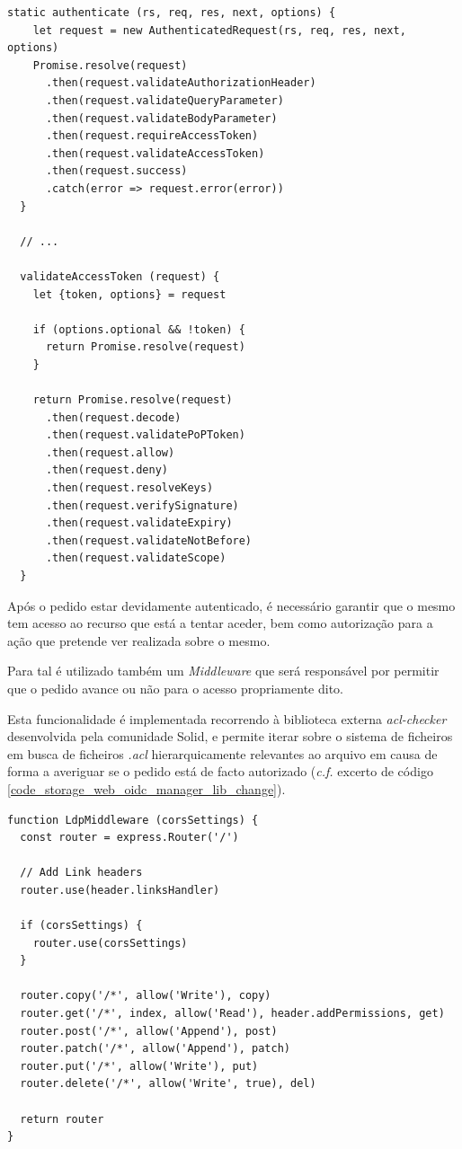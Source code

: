 \begin{lstlisting}[caption={Camada de validação do pedido e do token de acesso na biblioteca \emph{oidc-rs}}, label={code_storage_web_validacao_pedido_e_token}]
  static authenticate (rs, req, res, next, options) {
    let request = new AuthenticatedRequest(rs, req, res, next, options)
    Promise.resolve(request)
      .then(request.validateAuthorizationHeader)
      .then(request.validateQueryParameter)
      .then(request.validateBodyParameter)
      .then(request.requireAccessToken)
      .then(request.validateAccessToken)
      .then(request.success)
      .catch(error => request.error(error))
  }
  
  // ...

  validateAccessToken (request) {
    let {token, options} = request

    if (options.optional && !token) {
      return Promise.resolve(request)
    }

    return Promise.resolve(request)
      .then(request.decode)
      .then(request.validatePoPToken)
      .then(request.allow)
      .then(request.deny)
      .then(request.resolveKeys)
      .then(request.verifySignature)
      .then(request.validateExpiry)
      .then(request.validateNotBefore)
      .then(request.validateScope)
  }

\end{lstlisting}

Após o pedido estar devidamente autenticado, é necessário garantir que o mesmo tem acesso ao recurso que está a tentar aceder, bem como autorização para a ação que pretende ver realizada sobre o mesmo. 

Para tal é utilizado também um \emph{Middleware} que será responsável por permitir que o pedido avance ou não para o acesso propriamente dito.

Esta funcionalidade é implementada recorrendo à biblioteca externa \emph{acl-checker} desenvolvida pela comunidade Solid, e permite iterar sobre o sistema de ficheiros em busca de ficheiros \emph{.acl} hierarquicamente relevantes ao arquivo em causa de forma a averiguar se o pedido está de facto autorizado (\emph{c.f.} excerto de código \ref{code_storage_web_oidc_manager_lib_change}).

\begin{lstlisting}[caption={Alteração ao \emph{OIDCManager} na biblioteca \emph{oidc-auth-manager}}, label={code_storage_web_oidc_manager_lib_change}]
function LdpMiddleware (corsSettings) {
  const router = express.Router('/')

  // Add Link headers
  router.use(header.linksHandler)

  if (corsSettings) {
    router.use(corsSettings)
  }

  router.copy('/*', allow('Write'), copy)
  router.get('/*', index, allow('Read'), header.addPermissions, get)
  router.post('/*', allow('Append'), post)
  router.patch('/*', allow('Append'), patch)
  router.put('/*', allow('Write'), put)
  router.delete('/*', allow('Write', true), del)

  return router
}

\end{lstlisting}

